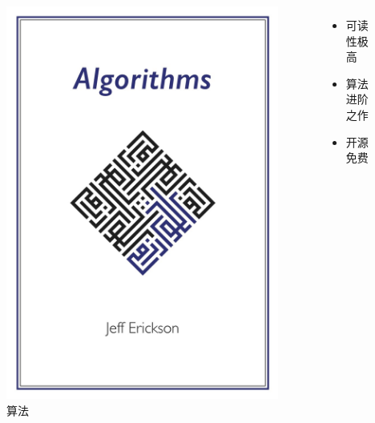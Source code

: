 \begin{frame}{\insertsubsectionhead}
    \begin{columns}
        \vspace{4ex}
        \begin{figure}
            \centering
            \includegraphics[height=0.6\textheight]{images/jeff2019algorithms.jpg}
            \caption{算法\cite{jeff2019algorithms}}
            \label{fig:jeff2019algorithms}
        \end{figure}
        \begin{itemize}
            \item 可读性极高
            \item 算法进阶之作
            \item 开源免费
        \end{itemize}
    \end{columns}
\end{frame}


